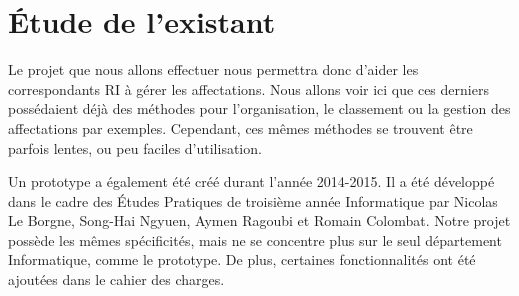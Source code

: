 \chapter{Étude de l'existant}
	
	
Le projet que nous allons effectuer nous permettra donc d'aider les correspondants RI à gérer les affectations. Nous allons voir ici que ces derniers possédaient déjà des méthodes pour l'organisation, le classement ou la gestion des affectations par exemples. Cependant, ces mêmes méthodes se trouvent être parfois lentes, ou peu faciles d'utilisation.

Un prototype a également été créé durant l'année 2014-2015. Il a été développé dans le cadre des Études Pratiques de troisième année Informatique par Nicolas Le Borgne, Song-Hai Ngyuen, Aymen Ragoubi et Romain Colombat. Notre projet possède les mêmes spécificités, mais ne se concentre plus sur le seul département Informatique, comme le prototype. De plus, certaines fonctionnalités ont été ajoutées dans le cahier des charges.

